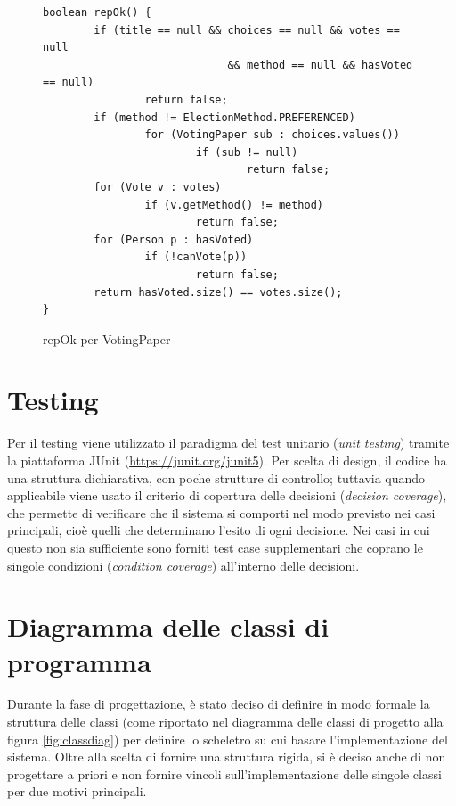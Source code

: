 \begin{figure}
	\centering
	\begin{verbatim}
boolean repOk() {
        if (title == null && choices == null && votes == null
                             && method == null && hasVoted == null)
                return false;
        if (method != ElectionMethod.PREFERENCED)
                for (VotingPaper sub : choices.values())
                        if (sub != null)
                                return false;
        for (Vote v : votes)
                if (v.getMethod() != method)
                        return false;
        for (Person p : hasVoted)
                if (!canVote(p))
                        return false;
        return hasVoted.size() == votes.size();
}
        \end{verbatim}
	\caption{repOk per VotingPaper}\label{repOk-VP}
\end{figure}




\section{Testing}\label{testing}
Per il testing viene utilizzato il paradigma del test unitario (\emph{unit testing}) tramite la piattaforma JUnit (\url{https://junit.org/junit5}). Per scelta di design, il codice ha una struttura dichiarativa, con poche strutture di controllo; tuttavia quando applicabile viene usato il criterio di copertura delle decisioni (\emph{decision coverage}), che permette di verificare che il sistema si comporti nel modo previsto nei casi principali, cioè quelli che determinano l'esito di ogni decisione. Nei casi in cui questo non sia sufficiente sono forniti test case supplementari che coprano le singole condizioni (\emph{condition coverage}) all'interno delle decisioni.




\section{Diagramma delle classi di programma}\label{implclassi}
Durante la fase di progettazione, è stato deciso di definire in modo formale la struttura delle classi (come riportato nel diagramma delle classi di progetto alla figura \ref{fig:classdiag}) per definire lo scheletro su cui basare l'implementazione del sistema.
Oltre alla scelta di fornire una struttura rigida, si è deciso anche di non progettare a priori e non fornire vincoli sull'implementazione delle singole classi per due motivi principali.

